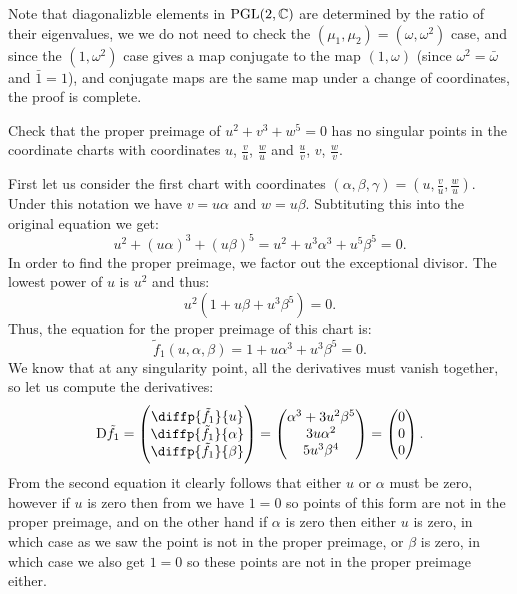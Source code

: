 \documentclass[11pt, a4paper]{article}
\begin{document}
\begin{solution}
  Note that diagonalizble elements in $\mathrm{PGL}(2,\mathbb{C})$ are determined
  by the ratio of their eigenvalues, we we do not need to check
  the $(\mu_1, \mu_2) = (\omega,\omega^2)$ case,
  and since the $(1,\omega^2)$ case gives a map conjugate to the map $(1,\omega)$
  (since $\omega^2 = \bar \omega$ and $\bar 1 = 1$),
  and conjugate maps are the same map under a change of coordinates,
  the proof is complete.
\end{solution}

\begin{exercise}
  Check that the proper preimage of $u^2 + v^3 + w^5 = 0$ has no singular
  points in the coordinate charts with coordinates $u$, $\frac{v}{u}$,
  $\frac{w}{u}$ and $\frac{u}{v}$, $v$, $\frac{w}{v}$.
\end{exercise}
\begin{solution}
  First let us consider the first chart with coordinates
  $(\alpha,\beta,\gamma) = (u,\frac{v}{u},\frac{w}{u})$.
  Under this notation we have $v = u \alpha$ and $w = u \beta$.
  Subtituting this into the original equation we get:
  \[
    u^2 + (u \alpha)^3 + (u \beta)^5 =
    u^2 + u^3 \alpha^3 + u^5 \beta^5 =
    0.
  \]
  In order to find the proper preimage,
  we factor out the exceptional divisor.
  The lowest power of $u$ is $u^2$ and thus:
  \[
    u^2 (1 + u \beta + u^3 \beta^5) =
    0.
  \]
  Thus, the equation for the proper preimage of this chart is:
  \begin{equation}
    \label{eq:eight-six}
    \tilde f_1(u,\alpha,\beta) = 1 + u \alpha^3 + u^3 \beta^5 = 0.
  \end{equation}
  We know that at any singularity point,
  all the derivatives must vanish together,
  so let us compute the derivatives:
  \[
    \Dif \tilde f_1 =
    \begin{pmatrix}
      \diffp{{\tilde f_1}}{u} \\
      \diffp{{\tilde f_1}}{\alpha} \\
      \diffp{{\tilde f_1}}{\beta}
    \end{pmatrix} =
    \begin{pmatrix}
      \alpha^3 + 3 u^2 \beta^5 \\
      3 u \alpha^2 \\
      5 u^3 \beta^4
    \end{pmatrix} =
    \begin{pmatrix}
      0 \\ 0 \\ 0
    \end{pmatrix}.
  \]
  From the second equation it clearly follows that either $u$ or $\alpha$
  must be zero, however if $u$ is zero then from 
  we have $1 = 0$ so points of this form are not in the proper preimage,
  and on the other hand if $\alpha$ is zero then either $u$ is zero,
  in which case as we saw the point is not in the proper preimage,
  or $\beta$ is zero, in which case we also get $1 = 0$ so these
  points are not in the proper preimage either.
  

\end{solution}
\end{document}
